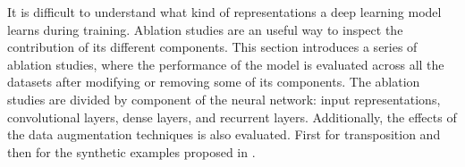 
It is difficult to understand what kind of representations a
deep learning model learns during training. Ablation studies
are an useful way to inspect the contribution of its
different components. This section introduces a series of
ablation studies, where the performance of the model is
evaluated across all the datasets after modifying or
removing some of its components. The ablation studies are
divided by component of the neural network: input
representations, convolutional layers, dense layers, and
recurrent layers. Additionally, the effects of the data
augmentation techniques is also evaluated. First for
transposition and then for the synthetic examples proposed
in .
